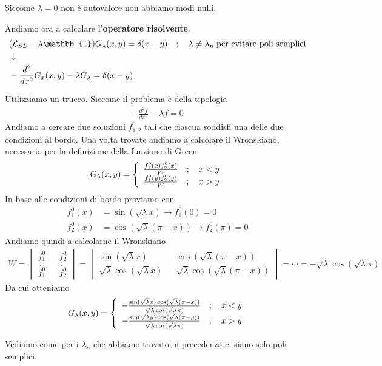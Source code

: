 Siccome $\lambda=0$ non è autovalore non abbiamo modi nulli.

Andiamo ora a calcolare l'\textbf{operatore risolvente}.
\begin{align}
	&(\mathcal{L}_{SL} -\lambda \mathbb{1}) G_\lambda (x,y) = \delta (x-y) \spacer \lambda \neq \lambda_n \; \text{per evitare poli semplici} \firstpassage
	&-\frac{d^2}{dx^2} G_x(x,y) - \lambda G_\lambda = \delta (x-y)
\end{align}

Utilizziamo un trucco. Siccome il problema è della tipologia
\begin{align}
	-\frac{d^2f}{dx^2} - \lambda f = 0
\end{align}
Andiamo a cercare due soluzioni $f^0_{1,2}$ tali che ciascua soddisfi una delle due condizioni al bordo. Una volta trovate andiamo a calcolare il Wronskiano, necessario per la definizione della funzione di Green
\begin{align}
	G_\lambda (x,y) = \left\{ \begin{array}{cc} \frac{f_1^0(x)f_2^0(x)}{W} \quad ; \quad x<y\\ \frac{f_1^0(y)f_2^0(y)}{W} \quad ; \quad x>y \end{array} \right.
\end{align}
In base alle condizioni di bordo proviamo con
\begin{align}
	f_1^0(x) &= \sin(\sqrt{\lambda} x) \to f_1^0(0) =0\\
	f_2^0(x) &= \cos(\sqrt{\lambda} (\pi-x)) \to f_2^0(\pi) =0
\end{align}
Andiamo quindi a calcolarne il Wronskiano
\begin{align}
	W = \begin{vmatrix}
		f_1^0 && f_2^0\\
		\dot{f_1^0} && \dot{f_2^0}
	\end{vmatrix} = \begin{vmatrix}
		\sin(\sqrt{\lambda} x) && \cos(\sqrt{\lambda} (\pi-x))\\
		\sqrt{\lambda}\cos(\sqrt{\lambda}x) && \sqrt{\lambda} \cos (\sqrt{\lambda} (\pi-x))
	\end{vmatrix} = \cdots = -\sqrt{\lambda} \cos( \sqrt{\lambda} \pi)
\end{align}
Da cui otteniamo
\begin{align}
	G_\lambda (x,y) = \left\{ \begin{array}{cc} -\frac{ \sin(\sqrt{\lambda} x)\cos(\sqrt{\lambda} (\pi-x))}{\sqrt{\lambda} \cos( \sqrt{\lambda} \pi)} \quad ; \quad x<y\\ -\frac{ \sin(\sqrt{\lambda} y)\cos(\sqrt{\lambda} (\pi-y))}{\sqrt{\lambda} \cos( \sqrt{\lambda} \pi)} \quad ; \quad x>y \end{array} \right.
\end{align}

Vediamo come per i $\lambda_n$ che abbiamo trovato in precedenza ci siano solo poli semplici.

